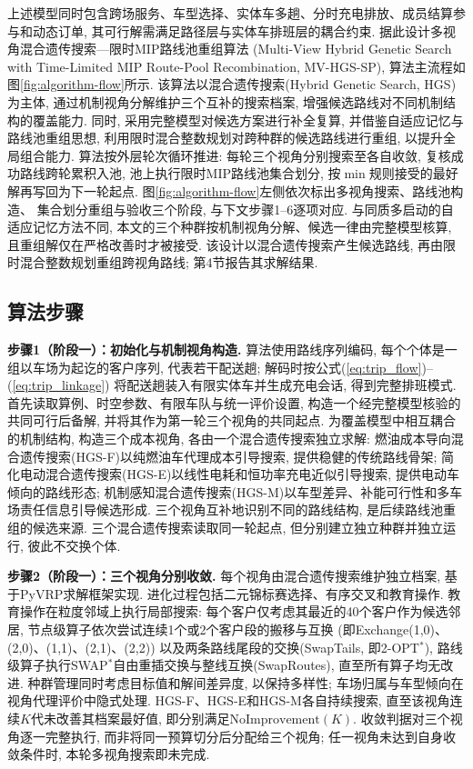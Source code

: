 \documentclass{setp-new}
\begin{document}
上述模型同时包含跨场服务、车型选择、实体车多趟、分时充电排放、成员结算参与和动态订单,
其可行解需满足路径层与实体车排班层的耦合约束.
据此设计多视角混合遗传搜索—限时MIP路线池重组算法
(Multi-View Hybrid Genetic Search with Time-Limited MIP Route-Pool Recombination, MV-HGS-SP),
算法主流程如图\ref{fig:algorithm-flow}所示.
该算法以混合遗传搜索(Hybrid Genetic Search, HGS)\cite{ref:76,ref:77}为主体,
通过机制视角分解维护三个互补的搜索档案, 增强候选路线对不同机制结构的覆盖能力.
同时, 采用完整模型对候选方案进行补全复算,
并借鉴自适应记忆与路线池重组思想\cite{ref:79,ref:80},
利用限时混合整数规划对跨种群的候选路线进行重组, 以提升全局组合能力.
算法按外层轮次循环推进: 每轮三个视角分别搜索至各自收敛,
复核成功路线跨轮累积入池, 池上执行限时MIP路线池集合划分,
按$\min$规则接受的最好解再写回为下一轮起点.
图\ref{fig:algorithm-flow}左侧依次标出多视角搜索、路线池构造、
集合划分重组与验收三个阶段, 与下文步骤1--6逐项对应.
与同质多启动的自适应记忆方法不同,
本文的三个种群按机制视角分解、候选一律由完整模型核算,
且重组解仅在严格改善时才被接受.
该设计以混合遗传搜索产生候选路线, 再由限时混合整数规划重组跨视角路线;
第4节报告其求解结果.



\subsection{算法步骤}

\textbf{步骤1（阶段一）：初始化与机制视角构造.}
算法使用路线序列编码, 每个个体是一组以车场为起讫的客户序列,
代表若干配送趟; 解码时按公式(\ref{eq:trip_flow})--(\ref{eq:trip_linkage})
将配送趟装入有限实体车并生成充电会话, 得到完整排班模式.
首先读取算例、时空参数、有限车队与统一评价设置, 构造一个经完整模型核验的共同可行后备解,
并将其作为第一轮三个视角的共同起点.
为覆盖模型中相互耦合的机制结构, 构造三个成本视角, 各由一个混合遗传搜索独立求解:
燃油成本导向混合遗传搜索(HGS-F)以纯燃油车代理成本引导搜索, 提供稳健的传统路线骨架;
简化电动混合遗传搜索(HGS-E)以线性电耗和恒功率充电近似引导搜索, 提供电动车倾向的路线形态;
机制感知混合遗传搜索(HGS-M)以车型差异、补能可行性和多车场责任信息引导候选形成.
三个视角互补地识别不同的路线结构, 是后续路线池重组的候选来源.
三个混合遗传搜索读取同一轮起点, 但分别建立独立种群并独立运行, 彼此不交换个体.

\textbf{步骤2（阶段一）：三个视角分别收敛.}
每个视角由混合遗传搜索\cite{ref:76}维护独立档案,
基于PyVRP求解框架\cite{ref:64}实现.
进化过程包括二元锦标赛选择、有序交叉和教育操作.
教育操作在粒度邻域上执行局部搜索: 每个客户仅考虑其最近的40个客户作为候选邻居,
节点级算子依次尝试连续1个或2个客户段的搬移与互换
(即Exchange(1,0)、(2,0)、(1,1)、(2,1)、(2,2))
以及两条路线尾段的交换(SwapTails, 即2-OPT$^*$),
路线级算子执行SWAP$^*$自由重插交换与整线互换(SwapRoutes),
直至所有算子均无改进.
种群管理同时考虑目标值和解间差异度, 以保持多样性\cite{ref:77};
车场归属与车型倾向在视角代理评价中隐式处理\cite{ref:78}.
HGS-F、HGS-E和HGS-M各自持续搜索, 直至该视角连续$K$代未改善其档案最好值,
即分别满足$\mathrm{NoImprovement}(K)$.
收敛判据对三个视角逐一完整执行, 而非将同一预算切分后分配给三个视角;
任一视角未达到自身收敛条件时, 本轮多视角搜索即未完成.
\end{document}

